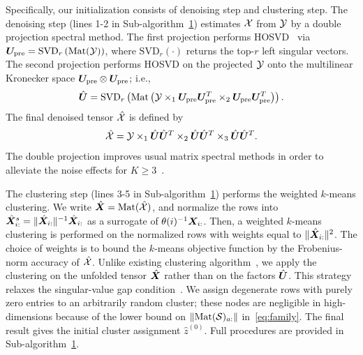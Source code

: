 \documentclass[lettersize,onecolumn,journal]{IEEEtran}
\theoremstyle{definition}
\theoremstyle{definition}
\newcommand{\of}[1]{\left(#1\right)}
\begin{document}
Specifically, our initialization consists of denoising step and clustering step. The denoising step (lines 1-2 in Sub-algorithm~\hyperref[alg:main]{1}) estimates $\mathcal{X}$ from $\mathcal{Y}$ by a double projection spectral method.  
The first projection performs HOSVD~\citep{de2000multilinear} via $\mU_{\text{pre}} = \text{SVD}_{r} \of{ \text{Mat}(\tY) }$, where $\text{SVD}_r(\cdot)$ returns the top-$r$ left singular vectors. The second projection performs HOSVD on the projected $\mathcal{Y}$ onto the multilinear Kronecker space $\bm{U}_{\text{pre}} \otimes  \bm{U}_{\text{pre}}$; i.e.,
\begin{equation}\label{eq:two-step_factor}
    \hat \mU = \text{SVD}_{r} \of{\text{Mat}\of{ \tY\times_1  \mU_{\text{pre}} \mU_{\text{pre}}^T \times_2   \mU_{\text{pre}} \mU_{\text{pre}}^T }}.
\end{equation}
The final denoised tensor $\hat {\mathcal{X}}$ is defined by
\begin{equation}\label{eq:two-step_est}
    \hat \tX = \tY \times_1 \hat \mU \hat 
\mU^T \times_2 \hat \mU \hat \mU^T \times_3 \hat \mU \hat \mU^T. 
\end{equation}
The double projection improves usual matrix spectral methods in order to alleviate the noise effects for $K\geq 3$~\citep{han2020exact}.

The clustering step (lines 3-5 in Sub-algorithm~\hyperref[alg:main]{1}) performs the weighted $k$-means clustering. 
We write $\hat {\bm X}=\text{Mat}(\hat {\mathcal{X}})$, and normalize the rows into $\hat {\bm X}^s_{i:}=\lVert\hat {\bm X}_{i:}\rVert^{-1}\hat {\bm X}_{i:}$ as a surrogate of $\theta(i)^{-1} \bm X_{i:}$. Then, a weighted $k$-means clustering is performed on the normalized rows with weights equal to $\lVert\hat {\bm X}_{i:}\rVert^2$. The choice of weights is to bound the $k$-means objective function by the Frobenius-norm accuracy of $\hat {\mathcal{X}}$. Unlike existing clustering algorithm~\citep{ke2019community}, we apply the clustering on the unfolded tensor $\hat {\bm X}$ rather than on the factors $\hat {\bm{U}}$. This strategy relaxes the singular-value gap condition~\citep{gao2018community, han2020exact}.
We assign degenerate rows with purely zero entries to an arbitrarily random cluster; these nodes are negligible in high-dimensions because of the lower bound on $\lVert\text{Mat}(\mathcal{S})_{a:}\rVert$ in~\eqref{eq:family}. The final result gives the initial cluster assignment $\hat z^{(0)}$. Full procedures are provided in Sub-algorithm~\hyperref[alg:main]{1}. 
\end{document}
